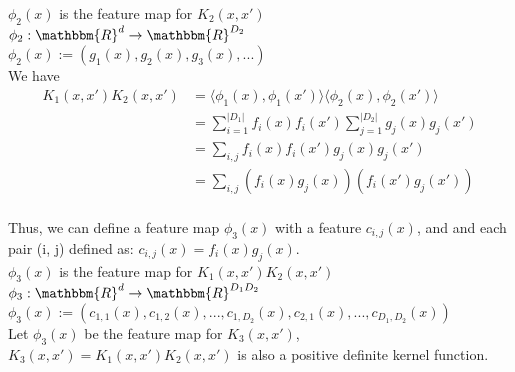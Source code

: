 \documentclass[twoside,11pt]{homework}
\begin{document}
$\phi_2 (x)$ is the feature map for $K_2(x, x')$\\
$\phi_2 : \mathbbm{R}^d \to  \mathbbm{R}^{D_2}$\\
$\phi_2 (x) := (g_1(x), g_2(x), g_3(x), ...)$\\

We have 
\begin{align*}
K_1(x, x')K_2(x, x') &= \langle \phi_1 (x), \phi_1 (x') \rangle \langle \phi_2 (x), \phi_2 (x') \rangle \\
&= {\sum_{i=1}^{|D_1|}f_i(x)f_i(x')}{\sum_{j=1}^{|D_2|}g_j(x)g_j(x')}\\
&= {\sum_{i, j}f_i(x)f_i(x')g_j(x)g_j(x')}\\
&= {\sum_{i, j}(f_i(x)g_j(x))(f_i(x')g_j(x'))}\\
\end{align*}

Thus, we can define a feature map $\phi_3 (x)$ with a feature $c_{i,j}(x)$,  and and each pair (i, j) defined as:
$c_{i,j}(x) = f_i(x)g_j(x)$.\\
$\phi_3(x)$ is the feature map for $K_1(x, x')K_2(x, x')$\\
$\phi_3 : \mathbbm{R}^d \to  \mathbbm{R}^{D_1D_2}$\\
$\phi_3 (x) := (c_{1,1}(x), c_{1,2}(x), ... , c_{1,D_2}(x), c_{2,1}(x),..., c_{D_1,D_2}(x))$\\

Let $\phi_3 (x)$ be the feature map for $K_3(x, x')$,  $K_3(x, x') = K_1(x, x')K_2(x, x')$ is also a positive definite kernel function. 
\end{document}
